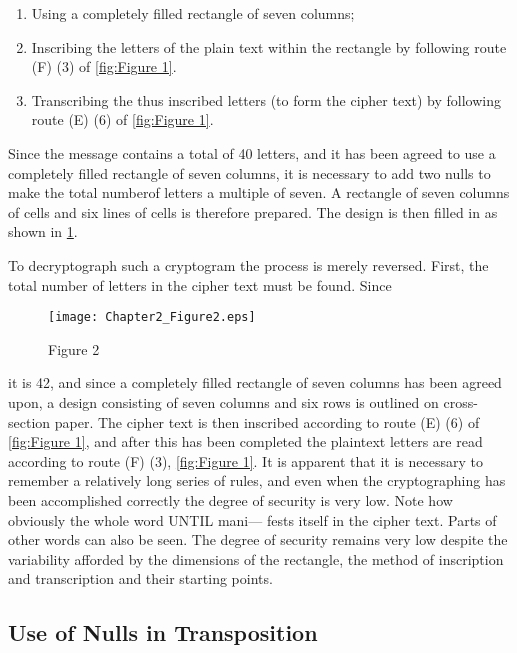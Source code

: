 \begin{enumerate}
\item Using a completely filled rectangle of seven columns;

\item Inscribing the letters of the plain text within the rectangle by
following route (F) (3) of \ref{fig:Figure 1}.

\item Transcribing the thus inscribed letters (to form the cipher text)
by following route (E) (6) of \ref{fig:Figure 1}.
\end{enumerate}

Since the message contains a total of 40 letters, and it has been
agreed to use a completely filled rectangle of seven columns, it is
necessary to add two nulls to make the total numberof letters a
multiple of seven. A rectangle of seven columns of cells and six
lines of cells is therefore prepared. The design is then filled in as
shown in \ref{fig:Figure 2}.

\mypara To decryptograph such a cryptogram the process is merely reversed.
First, the total number of letters in the cipher text must be found. Since

\begin{figure}[h]
  \centering
    \texttt{[image: Chapter2\_Figure2.eps]}
    \label{fig:Figure 2}
    \caption{Figure 2}
\end{figure}

it is 42, and since a completely filled rectangle of seven columns has been
agreed upon, a design consisting of seven columns and six rows is outlined on cross-section paper. The cipher text is then inscribed according
to route (E) (6) of \ref{fig:Figure 1}, and after this has been completed the plaintext letters are read according to route (F) (3), \ref{fig:Figure 1}. It is apparent
that it is necessary to remember a relatively long series of rules, and even
when the cryptographing has been accomplished correctly the degree of
security is very low. Note how obviously the whole word UNTIL mani—
fests itself in the cipher text. Parts of other words can also be seen.
The degree of security remains very low despite the variability afforded
by the dimensions of the rectangle, the method of inscription and transcription and their starting points.

\subsection{Use of Nulls in Transposition}

